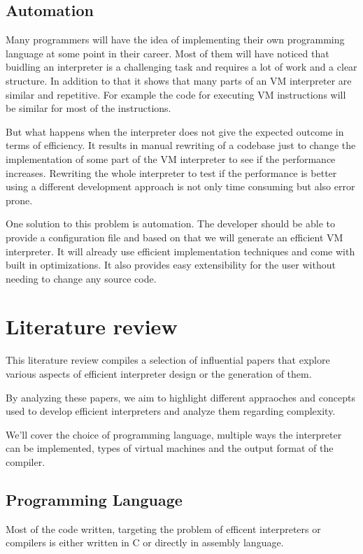 \documentclass{article}
\begin{document}
\subsection{Automation}
Many programmers will have the idea of implementing their own programming
language at some point in their career. Most of them will have noticed that
buidling an interpreter is a challenging task and requires a lot of work and
a clear structure. In addition to that it shows that many parts of an VM
interpreter are similar and repetitive. For example the code for executing 
VM instructions will be similar for most of the instructions. ~\cite{vmgen}

But what happens when the interpreter does not give the expected outcome in
terms of efficiency. It results in manual rewriting of a codebase just to
change the implementation of some part of the VM interpreter to see if the
performance increases. Rewriting the whole interpreter to test if the
performance is better using a different development approach is not only time
consuming but also error prone.

One solution to this problem is automation. The developer should be able to
provide a configuration file and based on that we will generate an efficient VM
interpreter. It will already use efficient implementation techniques and come
with built in optimizations. It also provides easy extensibility for the user
without needing to change any source code.

\section{Literature review}
This literature review compiles a selection of influential papers that explore
various aspects of efficient interpreter design or the generation of them. 

By analyzing these papers, we aim to highlight different appraoches and
concepts used to develop efficient interpreters and analyze them regarding
complexity.

We'll cover the choice of programming language, multiple ways the interpreter
can be implemented, types of virtual machines and the output format of the
compiler.

\subsection{Programming Language}
Most of the code written, targeting the problem of efficent interpreters or
compilers is either written in C or directly in assembly language.
\end{document}
